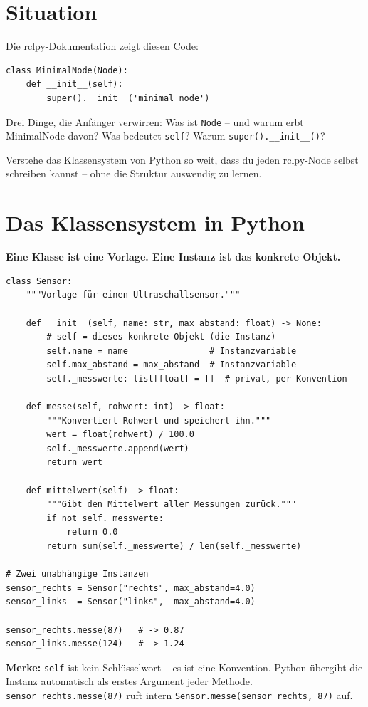 \section{Situation}

Die rclpy-Dokumentation zeigt diesen Code:

\begin{lstlisting}
class MinimalNode(Node):
    def __init__(self):
        super().__init__('minimal_node')
\end{lstlisting}

Drei Dinge, die Anfänger verwirren:
Was ist \texttt{Node} -- und warum erbt MinimalNode davon?
Was bedeutet \texttt{self}?
Warum \texttt{super().\_\_init\_\_()}?

\begin{aufgabeBox}
Verstehe das Klassensystem von Python so weit,
dass du jeden rclpy-Node selbst schreiben kannst --
ohne die Struktur auswendig zu lernen.
\end{aufgabeBox}

\section{Das Klassensystem in Python}

\begin{wissenBox}
\textbf{Eine Klasse ist eine Vorlage. Eine Instanz ist das konkrete Objekt.}

\begin{lstlisting}
class Sensor:
    """Vorlage für einen Ultraschallsensor."""

    def __init__(self, name: str, max_abstand: float) -> None:
        # self = dieses konkrete Objekt (die Instanz)
        self.name = name                # Instanzvariable
        self.max_abstand = max_abstand  # Instanzvariable
        self._messwerte: list[float] = []  # privat, per Konvention

    def messe(self, rohwert: int) -> float:
        """Konvertiert Rohwert und speichert ihn."""
        wert = float(rohwert) / 100.0
        self._messwerte.append(wert)
        return wert

    def mittelwert(self) -> float:
        """Gibt den Mittelwert aller Messungen zurück."""
        if not self._messwerte:
            return 0.0
        return sum(self._messwerte) / len(self._messwerte)

# Zwei unabhängige Instanzen
sensor_rechts = Sensor("rechts", max_abstand=4.0)
sensor_links  = Sensor("links",  max_abstand=4.0)

sensor_rechts.messe(87)   # -> 0.87
sensor_links.messe(124)   # -> 1.24
\end{lstlisting}

\textbf{Merke:} \texttt{self} ist kein Schlüsselwort -- es ist
eine Konvention. Python übergibt die Instanz automatisch
als erstes Argument jeder Methode.
\texttt{sensor\_rechts.messe(87)} ruft intern
\texttt{Sensor.messe(sensor\_rechts, 87)} auf.
\end{wissenBox}

